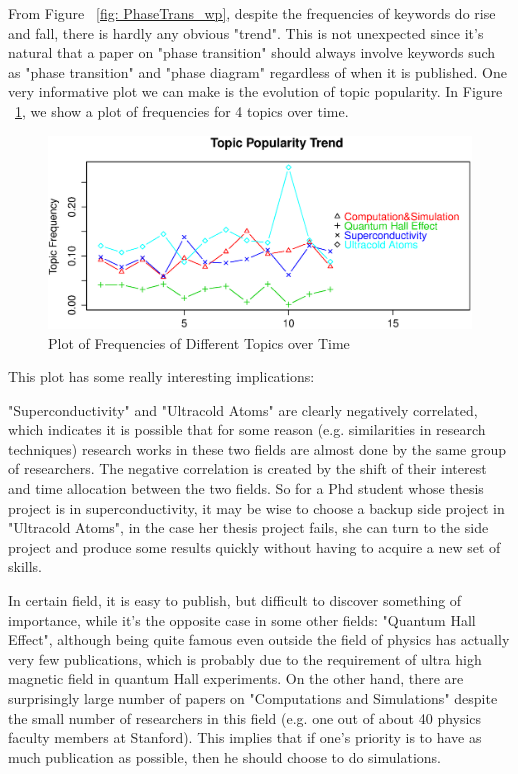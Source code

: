 \documentclass[DIV=calc, paper=letter, fontsize=10pt, twocolumn]{scrartcl}	 %
\begin{document}
From Figure ~\ref{fig: PhaseTrans_wp}, despite the frequencies of keywords do rise and fall, there is hardly any obvious "trend". This is not unexpected since it's natural that a paper on "phase transition" should always involve keywords such as "phase transition" and "phase diagram" regardless of when it is published.\newline
One very informative plot we can make is the evolution of topic popularity. In Figure ~\ref{fig: TopPop_p}, we show a plot of frequencies for 4 topics over time.
\begin{figure}[!ht]
  \includegraphics[scale = 0.365]{TopPop_p.eps}
  \caption{Plot of Frequencies of Different Topics over Time}
  \label{fig: TopPop_p}
\end{figure}
This plot has some really interesting implications: 
\begin{inparaenum}
\item "Superconductivity" and "Ultracold Atoms" are clearly negatively correlated, which indicates it is possible that for some reason (e.g. similarities in research techniques) research works in these two fields are almost done by the same group of researchers. The negative correlation is created by the shift of their interest and time allocation between the two fields. So for a Phd student whose thesis project is in superconductivity, it may be wise to choose a backup side project in "Ultracold Atoms", in the case her thesis project fails, she can turn to the side project and produce some results quickly without having to acquire a new set of skills.
\item In certain field, it is easy to publish, but difficult to discover something of importance, while it's the opposite case in some other fields: "Quantum Hall Effect", although being quite famous even outside the field of physics has actually very few publications, which is probably due to the requirement of ultra high magnetic field in quantum Hall experiments. On the other hand, there are surprisingly large number of papers on "Computations and Simulations" despite the small number of researchers in this field (e.g. one out of about 40 physics faculty members at Stanford). This implies that if one's priority is to have as much publication as possible, then he should choose to do simulations.
\end{inparaenum}
\end{document}
